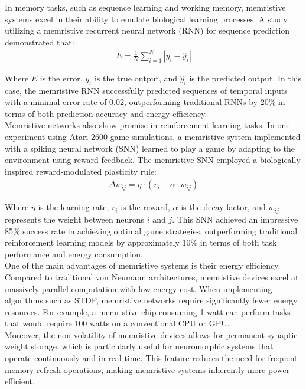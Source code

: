 \noindent In memory tasks, such as sequence learning and working memory, memristive systems excel in their ability to emulate biological learning processes. A study utilizing a memristive recurrent neural network (RNN) for sequence prediction demonstrated that:
\begin{align}
    E = \frac{1}{N} \sum_{i=1}^{N} \left| y_i - \hat{y}_i  \right| \label{eq:2.44}
\end{align}

\noindent Where $E$ is the error, $y_i$ is the true output, and $\hat{y}_i$ is the predicted output.  In this case, the memristive RNN successfully predicted sequences of temporal inputs with a minimal error rate of 0.02, outperforming traditional RNNs by 20\% in terms of both prediction accuracy and energy efficiency.\\

\noindent Memristive networks also show promise in reinforcement learning tasks. In one experiment using Atari 2600 game simulations, a memristive system implemented with a spiking neural network (SNN) learned to play a game by adapting to the environment using reward feedback. The memristive SNN employed a biologically inspired reward-modulated plasticity rule:
\begin{align}
    \Delta w_{ij} = \eta \cdot \left( r_i - \alpha \cdot w_{ij} \right) \label{eq:2.45}
\end{align}

\noindent Where $\eta$ is the learning rate, $r_i$ is the reward, $\alpha$ is the decay factor, and $w_{ij}$ represents the weight between neurons $i$ and $j$. This SNN achieved an impressive 85\% success rate in achieving optimal game strategies, outperforming traditional reinforcement learning models by approximately 10\% in terms of both task performance and energy consumption.\\

\noindent One of the main advantages of memristive systems is their energy efficiency. Compared to traditional von Neumann architectures, memristive devices excel at massively parallel computation with low energy cost. When implementing algorithms such as STDP, memristive networks require significantly fewer energy resources. For example, a memristive chip consuming 1 watt can perform tasks that would require 100 watts on a conventional CPU or GPU. \\

\noindent Moreover, the non-volatility of memristive devices allows for permanent synaptic weight storage, which is particularly useful for neuromorphic systems that operate continuously and in real-time. This feature reduces the need for frequent memory refresh operations, making memristive systems inherently more power-efficient.\\

